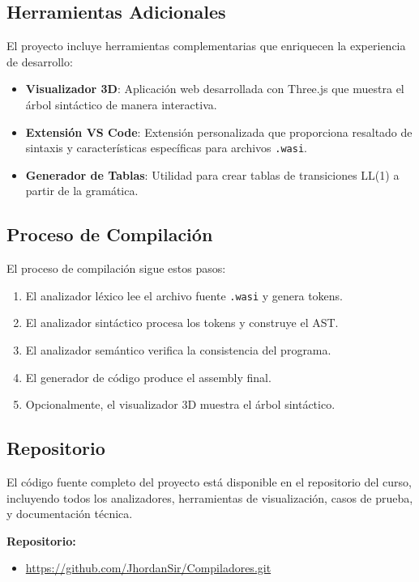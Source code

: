 \documentclass[conference]{IEEEtran}
\begin{document}
\subsection{Herramientas Adicionales}

El proyecto incluye herramientas complementarias que enriquecen la experiencia de desarrollo:

\begin{itemize}
\item \textbf{Visualizador 3D}: Aplicación web desarrollada con Three.js que muestra el árbol sintáctico de manera interactiva.
\item \textbf{Extensión VS Code}: Extensión personalizada que proporciona resaltado de sintaxis y características específicas para archivos \texttt{.wasi}.
\item \textbf{Generador de Tablas}: Utilidad para crear tablas de transiciones LL(1) a partir de la gramática.
\end{itemize}

\subsection{Proceso de Compilación}

El proceso de compilación sigue estos pasos:

\begin{enumerate}
\item El analizador léxico lee el archivo fuente \texttt{.wasi} y genera tokens.
\item El analizador sintáctico procesa los tokens y construye el AST.
\item El analizador semántico verifica la consistencia del programa.
\item El generador de código produce el assembly final.
\item Opcionalmente, el visualizador 3D muestra el árbol sintáctico.
\end{enumerate}

\subsection{Repositorio}

El código fuente completo del proyecto está disponible en el repositorio del curso, incluyendo todos los analizadores, herramientas de visualización, casos de prueba, y documentación técnica.

\noindent\textbf{Repositorio:} \\[-1em]
\begin{itemize}
  \item \url{https://github.com/JhordanSir/Compiladores.git}
\end{itemize}
\end{document}
